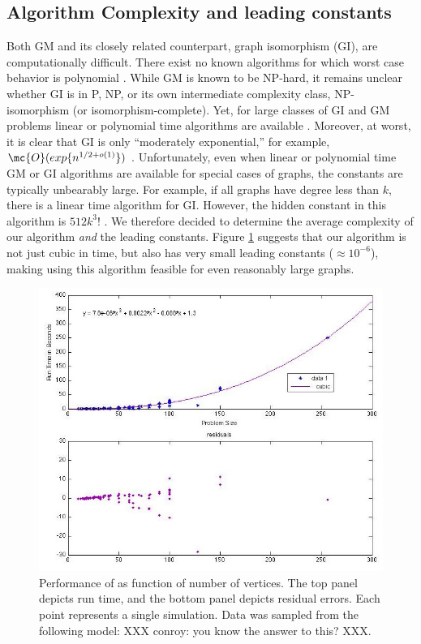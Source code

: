 \documentclass[10pt,journal,cspaper,compsoc]{IEEEtran}
\begin{document}


\subsection{Algorithm Complexity and leading constants} %
\label{sub:algorithm_complexity_and_leading_constants}

Both GM and its closely related counterpart, graph isomorphism (GI), are computationally difficult.  There exist no known algorithms for which worst case behavior is polynomial \cite{Fortin1996}.  While GM is known to be NP-hard, it remains unclear whether GI is in P, NP, or its own intermediate complexity class, NP-isomorphism (or isomorphism-complete).  Yet, for large classes of GI and GM problems linear or polynomial time algorithms are available \cite{Babai1980}.  Moreover, at worst, it is clear that GI is only ``moderately exponential,'' for example, $\mc{O}(exp\{n^{1/2 + o(1)}\})$ \cite{Babai1981}.  Unfortunately, even when linear or polynomial time GM or GI algorithms are available for special cases of graphs, the constants are typically unbearably large.  For example, if all graphs have degree less than $k$, there is a linear time algorithm for GI.  However, the hidden constant in this algorithm is $512k^3!$ \cite{Chen1994}.  We therefore decided to determine the average complexity of our algorithm \emph{and} the leading constants.  Figure \ref{fig:scaling} suggests that our algorithm is not just cubic in time, but also has very small leading constants ($\approx 10^{-6}$), making using this algorithm feasible for even reasonably large graphs.




\begin{figure}[htbp]
	\centering			
	\includegraphics[width=1.0\linewidth]{../figs/scaling_law.jpg}
	\caption{Performance of \qap as function of number of vertices.  The top panel depicts run time, and the bottom panel depicts residual errors.  Each point represents a single simulation.  Data was sampled from the following model: XXX conroy: you know the answer to this? XXX.}
	\label{fig:scaling}
\end{figure}
\end{document}
